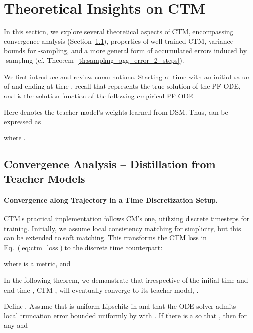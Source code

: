 \documentclass{article} \usepackage{iclr2024_coNFErence,times}
\def\eqref#1{equation~\ref{#1}}
\def\eqref#1{(\ref{#1})}
\def\eqref#1{(\ref{#1})}
\theoremstyle{definition}
\theoremstyle{remark}
\begin{document}
\section{Theoretical Insights on CTM}\label{appendix:general_theory}
In this section, we explore several theoretical aspects of CTM, encompassing convergence analysis (Section~\ref{sec:convergence_analysis}), properties of well-trained CTM, variance bounds for -sampling, and a more general form of accumulated errors induced by -sampling (cf. Theorem~\ref{th:sampling_agg_error_2_steps}).

We first introduce and review some notions. Starting at time  with an initial value of  and ending at time , recall that  represents the true solution of the PF ODE, and  is the solution function of the following empirical PF ODE.

Here  denotes the teacher model's weights learned from DSM. Thus,  can be expressed as

where .



\subsection{Convergence Analysis -- Distillation from Teacher Models}\label{sec:convergence_analysis}

\paragraph{Convergence along Trajectory in a Time Discretization Setup.}

CTM's practical implementation follows CM's one, utilizing discrete timesteps  for training. Initially, we assume local consistency matching for simplicity, but this can be extended to soft matching. This transforms the CTM loss in Eq.~\eqref{eq:ctm_loss} to the discrete time counterpart:

where  is a metric, and




In the following theorem, we demonstrate that irrespective of the initial time  and end time , CTM , will eventually converge to its teacher model, .



\begin{proposition}\label{th:ptw_distill} Define .  Assume
that  is uniform Lipschitz in  and that the ODE solver admits local truncation error bounded uniformly by  with . If there is a  so that , then for any  and   


\end{proposition}
\end{document}
